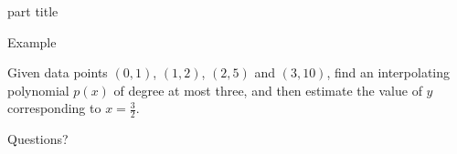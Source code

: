 \documentclass{beamer}
\begin{document}
\begin{frame}
  \begin{beamercolorbox}[sep=12pt,center]{part title}
    \insertsection\par
  \end{beamercolorbox}
\end{frame}

\begin{frame}{Example}
  \begin{example}
    Given data points $(0,1)$, $(1,2)$, $(2,5)$ and $(3,10)$,
    find an interpolating polynomial 
    $p(x)$ of degree at most three, 
    and then estimate the value of $y$ corresponding to $x=\frac{3}{2}$.
  \end{example}
\end{frame}

\begin{frame}
  Questions?
\end{frame}
\end{document}
